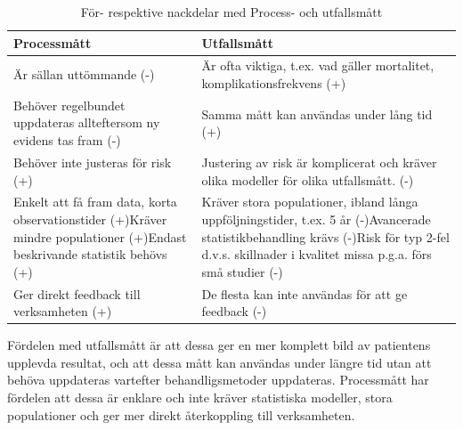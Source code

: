 \begin{table}[h]
\centering
\caption{För- respektive nackdelar med Process- och utfallsmått}
\label{mfornack}
\begin{tabular}{|p{6cm}|p{6cm}|}
\hline
Processmått                                                                                                               & Utfallsmått                                                                                                                                                                                        \\ \hline
Är sällan uttömmande (-)                                                                                                  & Är ofta viktiga, t.ex. vad gäller mortalitet, komplikationsfrekvens (+)                                                                                                                            \\ \hline
Behöver regelbundet uppdateras allteftersom ny evidens tas fram (-)                                                       & Samma mått kan användas under lång tid (+)                                                                                                                                                         \\ \hline
Behöver inte justeras för risk (+)                                                                                        & Justering av risk är komplicerat och kräver olika modeller för olika utfallsmått. (-)                                                                                                              \\ \hline
Enkelt att få fram data, korta observationstider (+)Kräver mindre populationer (+)Endast beskrivande statistik behövs (+) & Kräver stora populationer, ibland långa uppföljningstider, t.ex. 5 år (-)Avancerade statistikbehandling krävs (-)Risk för typ 2-fel d.v.s. skillnader i kvalitet missa p.g.a. förs små studier (-) \\ \hline
Ger direkt feedback till verksamheten (+)                                                                                 & De flesta kan inte användas för att ge feedback (-)                                                                                                                                                \\ \hline
\end{tabular}
\end{table}

Fördelen med utfallsmått är att dessa ger en mer komplett bild av patientens upplevda resultat, och att dessa mått kan användas under längre tid utan att behöva uppdateras vartefter behandligsmetoder uppdateras. Processmått har fördelen att dessa är enklare och inte kräver statistiska modeller, stora populationer och ger mer direkt återkoppling till verksamheten. 
 
